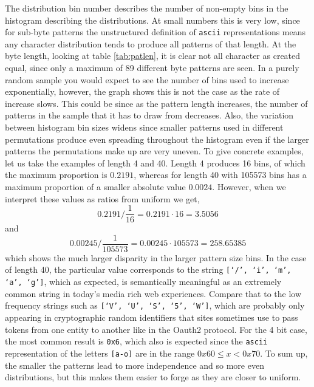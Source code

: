 \documentclass[ %
                    author={Samuel Russell},
                supervisor={Prof. Bogdan Warinschi},
                    degree={MEng},
                     title={Innocuous Ciphertexts},
                  subtitle={The DE-CENSOR Scheme},
                      type={research},
                      year={2018} ]{dissertation}
\begin{document}
The distribution bin number describes the number of non-empty bins in the histogram describing the distributions.
At small numbers this is very low, since for sub-byte patterns the unstructured definition of \texttt{ascii} representations means any character distribution tends to produce all patterns of that length.
At the byte length, looking at table \ref{tab:patlen}, it is clear not all character as created equal, since only a maximum of 89 different byte patterns are seen.
In a purely random sample you would expect to see the number of bins used to increase exponentially, however, the graph shows this is not the case as the rate of increase slows.
This could be since as the pattern length increases, the number of patterns in the sample that it has to draw from decreases.
Also, the variation between histogram bin sizes widens since smaller patterns used in different permutations produce even spreading throughout the histogram even if the larger patterns the permutations make up are very uneven.
To give concrete examples, let us take the examples of length 4 and 40.
Length 4 produces 16 bins, of which the maximum proportion is $0.2191$, whereas for length 40 with 105573 bins has a maximum proportion of a smaller absolute value $0.0024$.
However, when we interpret these values as ratios from uniform we get,
$$0.2191 / {\frac{1}{16}} = 0.2191 \cdot 16 = 3.5056$$
and
$${0.00245} / {\frac{1}{105573}} = 0.00245 \cdot 105573 = 258.65385$$
which shows the much larger disparity in the larger pattern size bins.
In the case of length 40, the particular value corresponds to the string \texttt{[`/', `i', `m', `a', `g']}, which as expected, is semantically meaningful as an extremely common string in today's media rich web experiences. Compare that to the low frequency strings such as \texttt{[`V', `U', `S', `5', `W']}, which are probably only appearing in cryptographic random identifiers that sites sometimes use to pass tokens from one entity to another like in the Oauth2 protocol.
For the 4 bit case, the most common result is \texttt{0x6}, which also is expected since the \texttt{ascii} representation of the letters \texttt{[a-o]} are in the range $0x60 \leq x < 0x70$.
To sum up, the smaller the patterns lead to more independence and so more even distributions, but this makes them easier to forge as they are closer to uniform.
\end{document}
